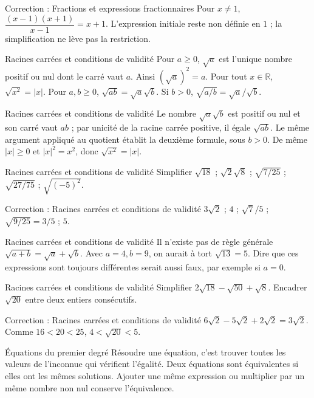 \documentclass[aspectratio=169,10pt]{beamer}
\providecommand{\R}{\mathbb{R}}
\begin{document}
\begin{frame}{Correction : Fractions et expressions fractionnaires}
Pour \(x\ne1\), \(\dfrac{(x-1)(x+1)}{x-1}=x+1\). L'expression initiale reste non définie en \(1\) ; la simplification ne lève pas la restriction.
\end{frame}
\begin{frame}{Racines carrées et conditions de validité}
Pour \(a\geq0\), \(\sqrt a\) est l'unique nombre positif ou nul dont le carré vaut \(a\). Ainsi \((\sqrt a)^2=a\). Pour tout \(x\in\R\), \(\sqrt{x^2}=|x|\).
Pour \(a,b\geq0\), \(\sqrt{ab}=\sqrt a\sqrt b\). Si \(b>0\), \(\sqrt{a/b}=\sqrt a/\sqrt b\).
\end{frame}
\begin{frame}{Racines carrées et conditions de validité}
Le nombre \(\sqrt a\sqrt b\) est positif ou nul et son carré vaut \(ab\) ; par unicité de la racine carrée positive, il égale \(\sqrt{ab}\). Le même argument appliqué au quotient établit la deuxième formule, sous \(b>0\). De même \(|x|\geq0\) et \(|x|^2=x^2\), donc \(\sqrt{x^2}=|x|\).
\end{frame}
\begin{frame}{Racines carrées et conditions de validité}
Simplifier \(\sqrt{18}\) ; \(\sqrt2\sqrt8\) ; \(\sqrt{7/25}\) ; \(\sqrt{27/75}\) ; \(\sqrt{(-5)^2}\).
\end{frame}
\begin{frame}{Correction : Racines carrées et conditions de validité}
\(3\sqrt2\) ; \(4\) ; \(\sqrt7/5\) ; \(\sqrt{9/25}=3/5\) ; \(5\).
\end{frame}
\begin{frame}{Racines carrées et conditions de validité}
Il n'existe pas de règle générale \(\sqrt{a+b}=\sqrt a+\sqrt b\). Avec \(a=4,b=9\), on aurait à tort \(\sqrt{13}=5\). Dire que ces expressions sont toujours différentes serait aussi faux, par exemple si \(a=0\).
\end{frame}
\begin{frame}{Racines carrées et conditions de validité}
Simplifier \(2\sqrt{18}-\sqrt{50}+\sqrt8\). Encadrer \(\sqrt{20}\) entre deux entiers consécutifs.
\end{frame}
\begin{frame}{Correction : Racines carrées et conditions de validité}
\(6\sqrt2-5\sqrt2+2\sqrt2=3\sqrt2\). Comme \(16<20<25\), \(4<\sqrt{20}<5\).
\end{frame}
\begin{frame}{Équations du premier degré}
Résoudre une équation, c'est trouver toutes les valeurs de l'inconnue qui vérifient l'égalité. Deux équations sont équivalentes si elles ont les mêmes solutions. Ajouter une même expression ou multiplier par un même nombre non nul conserve l'équivalence.
\end{frame}
\end{document}
